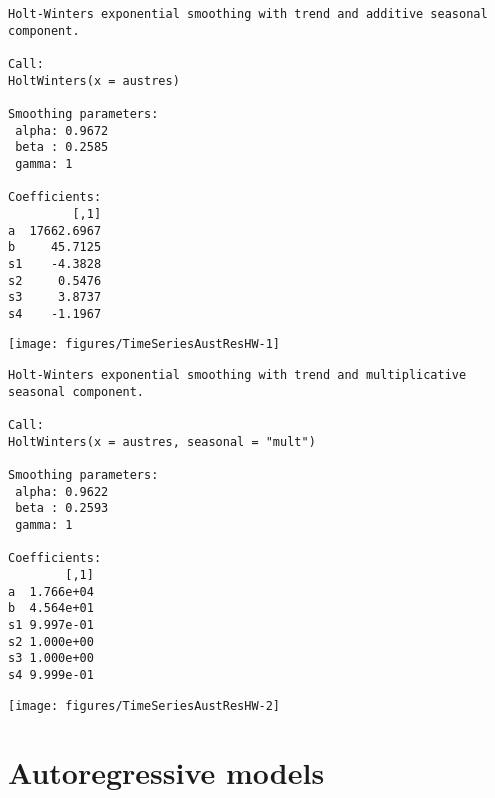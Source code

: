 \begin{knitrout}
\color{fgcolor}\begin{kframe}
\begin{alltt}
\hlstd{> } \hlkwb{=} 
\hlstd{> }
\end{alltt}
\begin{verbatim}
Holt-Winters exponential smoothing with trend and additive seasonal component.

Call:
HoltWinters(x = austres)

Smoothing parameters:
 alpha: 0.9672
 beta : 0.2585
 gamma: 1

Coefficients:
         [,1]
a  17662.6967
b     45.7125
s1    -4.3828
s2     0.5476
s3     3.8737
s4    -1.1967
\end{verbatim}
\begin{alltt}
\hlstd{> }
\end{alltt}
\end{kframe}
\texttt{[image: figures/TimeSeriesAustResHW-1]} 
\begin{kframe}\begin{alltt}
\hlstd{> } \hlkwb{=}  \hlstd{=}\hlstd{)}
\hlstd{> }
\end{alltt}
\begin{verbatim}
Holt-Winters exponential smoothing with trend and multiplicative seasonal component.

Call:
HoltWinters(x = austres, seasonal = "mult")

Smoothing parameters:
 alpha: 0.9622
 beta : 0.2593
 gamma: 1

Coefficients:
        [,1]
a  1.766e+04
b  4.564e+01
s1 9.997e-01
s2 1.000e+00
s3 1.000e+00
s4 9.999e-01
\end{verbatim}
\begin{alltt}
\hlstd{> }
\end{alltt}
\end{kframe}
\texttt{[image: figures/TimeSeriesAustResHW-2]} 

\end{knitrout}
 
 
 
 
 
 
\section{Autoregressive models} 
 
